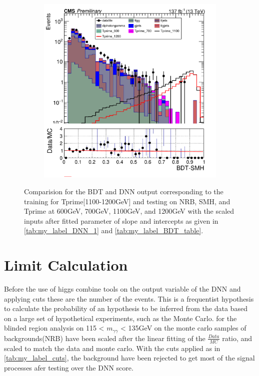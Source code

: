 \begin{figure}[H]
\begin{subfigure}[b]{0.47\textwidth}
         \includegraphics[width=\textwidth]{BDT_Output/Stacked_plot_BDT_1100-1200_with_diphoton_cuts_with_scaled_inputs.pdf}
         \label{fig:three sin x}
     \end{subfigure}
    \hfill
     \label{fig:}
     \caption{Comparision for the BDT and DNN output corresponding to the training for Tprime[1100-1200GeV] and testing on NRB, SMH, and Tprime at 600GeV, 700GeV, 1100GeV, and 1200GeV with the scaled inputs after fitted parameter of slope and intercepts as given in \autoref{tab:my_label_DNN_1} and \autoref{tab:my_label_BDT_table}.}
\end{figure}








 \section{Limit Calculation}
Before the use of higgs combine tools on the output variable of the DNN and applying cuts these are the number of the events. This is a frequentist hypothesis to calculate the probability of an hypothesis to be inferred from the data based on a large set of hypothetical experiments, such as the Monte Carlo. 
for the blinded region analysis on 115 < $m_{\gamma\gamma}$ < 135GeV on the monte carlo samples of backgrounds(NRB) have been scaled after the linear fitting of the $\frac{Data}{MC}$ ratio, and scaled to match the data and monte carlo. 
With the cuts applied as in \autoref{tab:my_label_cuts}, the background have been rejected to get most of the signal processes afer testing over the DNN score. 


